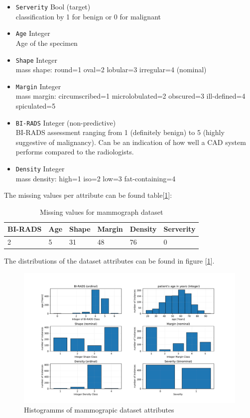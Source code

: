 \documentclass[11pt]{article}
\begin{document}
\begin{multicols}{2}
\begin{itemize}
\item \texttt{Serverity} Bool (target) \\
classification by 1 for benign or 0 for malignant
\item \texttt{Age} Integer  \\
Age of the specimen
\item \texttt{Shape} Integer  \\
mass shape: round=1 oval=2 lobular=3 irregular=4 (nominal) 
\item \texttt{Margin} Integer  \\
mass margin: circumscribed=1 microlobulated=2 obscured=3 ill-defined=4 spiculated=5 
\columnbreak
\item \texttt{BI-RADS} Integer (non-predictive)\\
 BI-RADS assessment ranging from 1 (definitely benign)
to 5 (highly suggestive of malignancy). Can be an indication of how well a CAD system performs compared to the radiologists.
\item \texttt{Density} Integer  \\
mass density: high=1 iso=2 low=3 fat-containing=4
\end{itemize}
\end{multicols}

The missing values per attribute can be found table[\ref{tab:mamm1}]:

\begin{table}[H]
\begin{tabularx}{1.0\linewidth}{XXXXXX}
\hline
BI-RADS & Age &Shape &Margin & Density & Serverity  \\
\hline
2 & 5 & 31 & 48 & 76 & 0
\end{tabularx}
\label{tab:mamm1}
\caption{Missing values for mammograph dataset}
\end{table}

The distributions of the dataset attributes can be found in figure [\ref{fig:Mamm}].

\begin{figure}[H]
\includegraphics[width=1.0\linewidth]{Mammograph.pdf}
\caption{Histogramms of mammograpic dataset attributes}
\label{fig:Mamm}
\end{figure}
\end{document}

